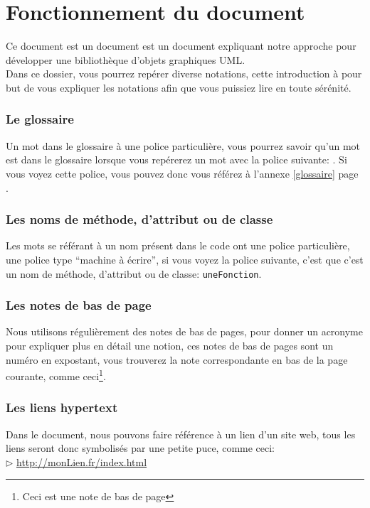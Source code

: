 \chapter*{Fonctionnement du document}
Ce document est un document est un document expliquant notre approche pour développer une bibliothèque d'objets graphiques UML.\\
Dans ce dossier, vous pourrez repérer diverse notations, cette introduction à pour but de vous expliquer les notations afin
que vous puissiez lire en toute sérénité.
\subsection*{Le glossaire}
Un mot dans le glossaire à une police particulière, vous pourrez savoir qu'un mot est dans le glossaire lorsque vous repérerez un mot avec la police suivante: 
. Si vous voyez cette police, vous pouvez donc vous référez à l'annexe \ref{glossaire} page \pageref{glossaire}.
\subsection*{Les noms de méthode, d'attribut ou de classe}
Les mots se référant à un nom présent dans le code ont une police particulière, une police type ``machine à écrire'', si vous voyez la police suivante, c'est que c'est un nom 
de méthode, d'attribut ou de classe: \texttt{uneFonction}.
\subsection*{Les notes de bas de page}
Nous utilisons régulièrement des notes de bas de pages, pour donner un acronyme pour expliquer plus en détail une notion, ces notes de bas de pages sont un numéro
en expostant, vous trouverez la note correspondante en bas de la page courante, comme ceci\footnote{Ceci est une note de bas de page}.
\subsection*{Les liens hypertext}
Dans le document, nous pouvons faire référence à un lien d'un site web, tous les liens seront donc symbolisés par une petite puce, comme ceci:\\
	$\rhd$ \url{http://monLien.fr/index.html}\\

